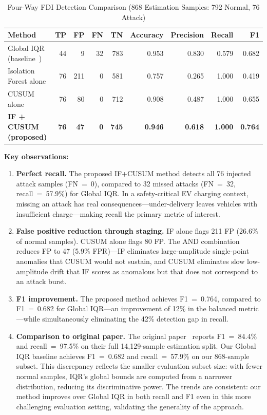 \documentclass[journal]{IEEEtran}
\newcommand{\cusum}{CUSUM}
\begin{document}
\begin{table}[!t]
\centering
\caption{Four-Way FDI Detection Comparison (868 Estimation Samples: 792 Normal, 76 Attack)}
\label{tab:fourway}
\begin{tabular}{@{}lrrrrrrrr@{}}
\toprule
\textbf{Method} & \textbf{TP} & \textbf{FP} & \textbf{FN} & \textbf{TN}
  & \textbf{Accuracy} & \textbf{Precision} & \textbf{Recall} & \textbf{F1} \\
\midrule
Global IQR (baseline~\cite{basumatary2025})
  & 44 & 9  & 32 & 783 & 0.953 & 0.830 & 0.579 & 0.682 \\
Isolation Forest alone
  & 76 & 211 & 0  & 581 & 0.757 & 0.265 & 1.000 & 0.419 \\
CUSUM alone
  & 76 & 80  & 0  & 712 & 0.908 & 0.487 & 1.000 & 0.655 \\
\textbf{IF + CUSUM (proposed)}
  & \textbf{76} & \textbf{47} & \textbf{0} & \textbf{745}
  & \textbf{0.946} & \textbf{0.618} & \textbf{1.000} & \textbf{0.764} \\
\bottomrule
\end{tabular}
\end{table}

\textbf{Key observations:}

\begin{enumerate}
\item \textbf{Perfect recall.} The proposed IF+\cusum{} method detects
all 76 injected attack samples (FN~=~0), compared to 32 missed attacks
(FN~=~32, recall~=~57.9\%) for Global IQR. In a safety-critical EV
charging context, missing an attack has real consequences---under-delivery
leaves vehicles with insufficient charge---making recall the primary
metric of interest.

\item \textbf{False positive reduction through staging.}
IF alone flags 211 FP (26.6\% of normal samples). CUSUM alone flags 80 FP.
The AND combination reduces FP to 47 (5.9\% FPR)---IF eliminates
large-amplitude single-point anomalies that CUSUM would not sustain,
and CUSUM eliminates slow low-amplitude drift that IF scores as
anomalous but that does not correspond to an attack burst.

\item \textbf{F1 improvement.}
The proposed method achieves F1~=~0.764, compared to F1~=~0.682 for
Global IQR---an improvement of 12\% in the balanced metric---while
simultaneously eliminating the 42\% detection gap in recall.

\item \textbf{Comparison to original paper.}
The original paper~\cite{basumatary2025} reports F1~=~84.4\% and
recall~=~97.5\% on their full 14,129-sample estimation split.
Our Global IQR baseline achieves F1~=~0.682 and recall~=~57.9\%
on our 868-sample subset. This discrepancy reflects the smaller
evaluation subset size: with fewer normal samples, IQR's global
bounds are computed from a narrower distribution, reducing its
discriminative power. The trends are consistent: our method improves
over Global IQR in both recall and F1 even in this more challenging
evaluation setting, validating the generality of the approach.
\end{enumerate}
\end{document}
